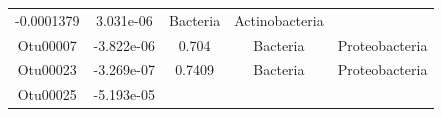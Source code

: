 \documentclass[]{article}
\begin{document}
\begin{longtable}[]{@{}ccccc@{}}
\begin{minipage}[t]{0.16\columnwidth}
-0.0001379\strut
\end{minipage} & \begin{minipage}[t]{0.14\columnwidth}\centering\strut
3.031e-06\strut
\end{minipage} & \begin{minipage}[t]{0.13\columnwidth}\centering\strut
Bacteria\strut
\end{minipage} & \begin{minipage}[t]{0.27\columnwidth}\centering\strut
Actinobacteria\strut
\end{minipage}\tabularnewline
\begin{minipage}[t]{0.13\columnwidth}\centering\strut
Otu00007\strut
\end{minipage} & \begin{minipage}[t]{0.16\columnwidth}\centering\strut
-3.822e-06\strut
\end{minipage} & \begin{minipage}[t]{0.14\columnwidth}\centering\strut
0.704\strut
\end{minipage} & \begin{minipage}[t]{0.13\columnwidth}\centering\strut
Bacteria\strut
\end{minipage} & \begin{minipage}[t]{0.27\columnwidth}\centering\strut
Proteobacteria\strut
\end{minipage}\tabularnewline
\begin{minipage}[t]{0.13\columnwidth}\centering\strut
Otu00023\strut
\end{minipage} & \begin{minipage}[t]{0.16\columnwidth}\centering\strut
-3.269e-07\strut
\end{minipage} & \begin{minipage}[t]{0.14\columnwidth}\centering\strut
0.7409\strut
\end{minipage} & \begin{minipage}[t]{0.13\columnwidth}\centering\strut
Bacteria\strut
\end{minipage} & \begin{minipage}[t]{0.27\columnwidth}\centering\strut
Proteobacteria\strut
\end{minipage}\tabularnewline
\begin{minipage}[t]{0.13\columnwidth}\centering\strut
Otu00025\strut
\end{minipage} & \begin{minipage}[t]{0.16\columnwidth}\centering\strut
-5.193e-05\strut
\end{minipage} & \begin{minipage}[t]{0.14\columnwidth}\centering\strut

\end{minipage}
\end{longtable}
\end{document}
